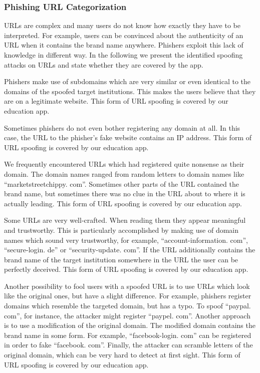 \subsubsection{Phishing URL Categorization}
\label{s:url_categories}
URLs are complex and many users do not know how exactly they have to be interpreted.
 For example, users can be convinced about the authenticity of an URL when it contains the brand name anywhere.
 Phishers exploit this lack of knowledge in different way.
 In the following we present the identified spoofing attacks on URLs and state whether they are covered by the app.

\begin{description}[leftmargin=0cm]
	\item[Subdomain] Phishers make use of subdomains which are very similar or even identical to the domains of the spoofed target institutions.
 This makes the users believe that they are on a legitimate website.
 This form of URL spoofing is covered by our education app.

	\item[IP Address] Sometimes phishers do not even bother registering any domain at all.
 In this case, the URL to the phisher's fake website contains an IP address.
 This form of URL spoofing is covered by our education app.

	\item[Nonsense Domain] We frequently encountered URLs which had registered quite nonsense as their domain.
 The domain names ranged from random letters to domain names like ``marketstreetchippy.
com''. Sometimes other parts of the URL contained the brand name, but sometimes there was no clue in the URL about to where it is actually leading.
 This form of URL spoofing is covered by our education app.

	\item[Trustworthy, But Unrelated Domain] Some URLs are very well-crafted.
 When reading them they appear meaningful and trustworthy.
 This is particularly accomplished by making use of domain names which sound very trustworthy, for example, ``account-information.
com'', ``secure-login.
de'' or ``security-update.
com''. If the URL additionally contains the brand name of the target institution somewhere in the URL the user can be perfectly deceived.
 This form of URL spoofing is covered by our education app.

	\item[Similar and Deceptive Domains] Another possibility to fool users with a spoofed URL is to use URLs which look like the original ones, but have a slight difference.
 For example, phishers register domains which resemble the targeted domain, but has a typo.
 To spoof ``paypal.
com'', for instance, the attacker might register ``paypel.
com''. Another approach is to use a modification of the original domain.
 The modified domain contains the brand name in some form.
 For example, ``facebook-login.
com'' can be registered in order to fake ``facebook.
com''. Finally, the attacker can scramble letters of the original domain, which can be very hard to detect at first sight.
 This form of URL spoofing is covered by our education app.


\end{description}
